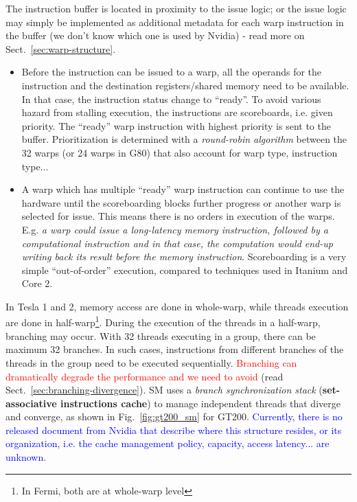 \begin{framed}
  The instruction buffer is located in proximity to the issue logic; or
  the issue logic may simply be implemented as additional metadata for
  each warp instruction in the buffer (we don't know which one is used
  by Nvidia) - read more on Sect.~\ref{sec:warp-structure}.
\end{framed}

\begin{itemize}
\item Before the instruction can be issued to a warp, all the operands
  for the instruction and the destination registers/shared memory need
  to be available. In that case, the instruction status change to
  ``ready''. To avoid various hazard from stalling execution, the
  instructions are scoreboards, i.e. given priority.  The ``ready''
  warp instruction with highest priority is sent to the
  buffer. Prioritization is determined with a
  {\it round-robin algorithm} between the 32 warps (or 24 warps in
  G80) that also account for warp type, instruction type...

\item A warp which has multiple ``ready'' warp instruction can
  continue to use the hardware until the scoreboarding blocks further
  progress or another warp is selected for issue. This means there is
  no orders in execution of the warps. E.g.
  {\it a warp could issue a long-latency memory instruction, followed
    by a computational instruction and in that case, the computation
    would end-up writing back its result before the memory
    instruction}.
  Scoreboarding is a very simple ``out-of-order'' execution, compared
  to techniques used in Itanium and Core 2.
\end{itemize}

In Tesla 1 and 2, memory access are done in whole-warp, while threads
execution are done in
half-warp\footnote{In Fermi, both are at whole-warp level}. During the
execution of the threads in a half-warp, branching may occur. With 32
threads executing in a group, there can be maximum 32 branches. In
such cases, instructions from different branches of the threads in the
group need to be executed sequentially.
\textcolor{red}{Branching can dramatically degrade the performance and
  we need to avoid}
(read Sect.~\ref{sec:branching-divergence}). SM uses a
{\it branch synchronization stack}
({\bf set-associative instructions cache}) to manage independent
threads that diverge and converge, as shown in Fig.~\ref{fig:gt200_sm}
for GT200.
\textcolor{blue}{Currently, there is no released document from Nvidia
  that describe where this structure resides, or its organization,
  i.e. the cache management policy, capacity, access latency... are
  unknown}.

